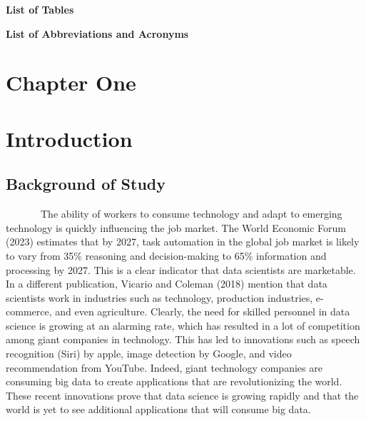 \documentclass[
  12pt,
]{article}
\begin{document}
\newpage

\centering
\raggedright
\newpage

\tableofcontents

\newpage

\begin{centering}

{\bf List of Tables}

\end{centering}

\doublespacing
\large

\newpage
\listoffigures

\doublespacing
\large

\newpage

\begin{centering}

{\bf List of Abbreviations and Acronyms}

\end{centering}

\doublespacing
\large

\newpage
{}

\doublespacing
\large
\justifying

\section{Chapter One}\label{chapter-one}

\section*{Introduction}\label{introduction}

\subsection{Background of Study}\label{background-of-study}

~~~~~~~The ability of workers to consume technology and adapt to
emerging technology is quickly influencing the job market. The World
Economic Forum (2023) estimates that by 2027, task automation in the
global job market is likely to vary from 35\% reasoning and
decision-making to 65\% information and processing by 2027. This is a
clear indicator that data scientists are marketable. In a different
publication, Vicario and Coleman (2018) mention that data scientists
work in industries such as technology, production industries,
e-commerce, and even agriculture. Clearly, the need for skilled
personnel in data science is growing at an alarming rate, which has
resulted in a lot of competition among giant companies in technology.
This has led to innovations such as speech recognition (Siri) by apple,
image detection by Google, and video recommendation from YouTube.
Indeed, giant technology companies are consuming big data to create
applications that are revolutionizing the world. These recent
innovations prove that data science is growing rapidly and that the
world is yet to see additional applications that will consume big data.
\end{document}
